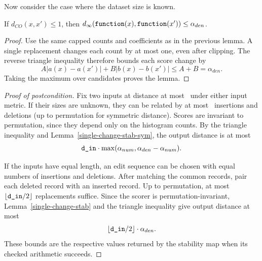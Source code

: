 \documentclass{article}
\begin{document}
\label{sec:known-size}
Now consider the case where the dataset size is known.

\begin{lemma}
    \label{single-change-stab}
    If $d_{CO}(x, x') \le 1$, then $d_\infty(\texttt{function}(x), \texttt{function}(x')) \le \alpha_{den}$.
\end{lemma}

\begin{proof}
    Use the same capped counts and coefficients as in the previous lemma.
    A single replacement changes each count by at most one, even after clipping.
    The reverse triangle inequality therefore bounds each score change by
    \[
        A|a(x)-a(x')|+B|b(x)-b(x')|
        \leq A+B=\alpha_{den}.
    \]
    Taking the maximum over candidates proves the lemma.
\end{proof}

\begin{proof}[Proof of postcondition]
    Fix two inputs at distance at most \din\ under either input metric.
    If their sizes are unknown, they can be related by at most \din\ insertions and deletions (up to permutation for symmetric distance).
    Scores are invariant to permutation, since they depend only on the histogram counts.
    By the triangle inequality and Lemma~\ref{single-change-stab-sym}, the output distance is at most
    \[
        \texttt{d\_in}\cdot\max(\alpha_{num},\alpha_{den}-\alpha_{num}).
    \]

    If the inputs have equal length, an edit sequence can be chosen with equal numbers of insertions and deletions.
    After matching the common records, pair each deleted record with an inserted record.
    Up to permutation, at most $\lfloor\texttt{d\_in}/2\rfloor$ replacements suffice.
    Since the scorer is permutation-invariant, Lemma~\ref{single-change-stab} and the triangle inequality give output distance at most
    \[
        \lfloor\texttt{d\_in}/2\rfloor\cdot\alpha_{den}.
    \]
    These bounds are the respective values returned by the stability map when its checked arithmetic succeeds.
\end{proof}
\end{document}
